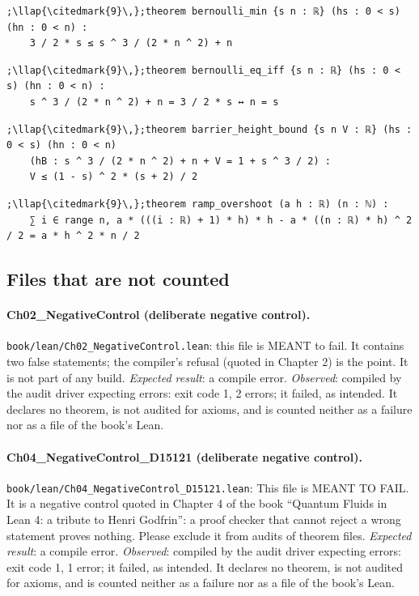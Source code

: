 \begin{lstlisting}[style=leancat]
;\llap{\citedmark{9}\,};theorem bernoulli_min {s n : ℝ} (hs : 0 < s) (hn : 0 < n) :
    3 / 2 * s ≤ s ^ 3 / (2 * n ^ 2) + n
\end{lstlisting}

\begin{lstlisting}[style=leancat]
;\llap{\citedmark{9}\,};theorem bernoulli_eq_iff {s n : ℝ} (hs : 0 < s) (hn : 0 < n) :
    s ^ 3 / (2 * n ^ 2) + n = 3 / 2 * s ↔ n = s
\end{lstlisting}

\begin{lstlisting}[style=leancat]
;\llap{\citedmark{9}\,};theorem barrier_height_bound {s n V : ℝ} (hs : 0 < s) (hn : 0 < n)
    (hB : s ^ 3 / (2 * n ^ 2) + n + V = 1 + s ^ 3 / 2) :
    V ≤ (1 - s) ^ 2 * (s + 2) / 2
\end{lstlisting}

\begin{lstlisting}[style=leancat]
;\llap{\citedmark{9}\,};theorem ramp_overshoot (a h : ℝ) (n : ℕ) :
    ∑ i ∈ range n, a * (((i : ℝ) + 1) * h) * h - a * ((n : ℝ) * h) ^ 2 / 2 = a * h ^ 2 * n / 2
\end{lstlisting}

\subsection*{Files that are not counted}
\paragraph{Ch02\_\allowbreak{}NegativeControl (deliberate negative control).} {\footnotesize\raggedright\texttt{book/lean/Ch02\_\allowbreak{}NegativeControl.\allowbreak{}lean}: this file is MEANT to fail.\allowbreak{} It contains two false statements; the compiler's refusal (quoted in Chapter 2) is the point.\allowbreak{} It is not part of any build.\allowbreak{} \emph{Expected result}: a compile error. \emph{Observed}: compiled by the audit driver expecting errors: exit code 1, 2 errors; it failed, as intended. It declares no theorem, is not audited for axioms, and is counted neither as a failure nor as a file of the book's Lean.\par}
\paragraph{Ch04\_\allowbreak{}NegativeControl\_\allowbreak{}D15121 (deliberate negative control).} {\footnotesize\raggedright\texttt{book/lean/Ch04\_\allowbreak{}NegativeControl\_\allowbreak{}D15121.\allowbreak{}lean}: This file is MEANT TO FAIL.\allowbreak{} It is a negative control quoted in Chapter 4 of the book “Quantum Fluids in Lean 4: a tribute to Henri Godfrin”: a proof checker that cannot reject a wrong statement proves nothing.\allowbreak{} Please exclude it from audits of theorem files.\allowbreak{} \emph{Expected result}: a compile error. \emph{Observed}: compiled by the audit driver expecting errors: exit code 1, 1 error; it failed, as intended. It declares no theorem, is not audited for axioms, and is counted neither as a failure nor as a file of the book's Lean.\par}
